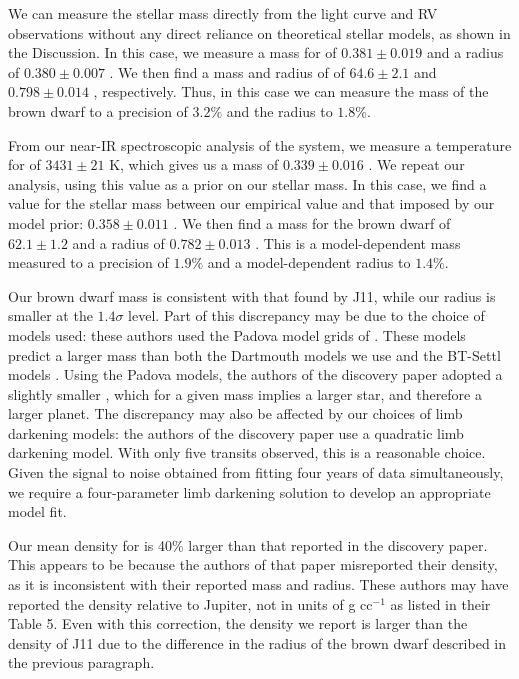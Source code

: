 We can measure the stellar mass directly from the light curve and RV observations without any direct reliance on theoretical stellar models, as shown in the Discussion.
In this case, we measure a mass for \LA{} of $0.381 \pm 0.019$ \msun{} and a radius of $0.380 \pm 0.007$ \rsun.  
We then find a mass and radius of \LC{} of $64.6 \pm 2.1$ \mjup{} and $0.798 \pm 0.014$ \rjup, respectively.
Thus, in this case we can measure the mass of the brown dwarf to a precision of $3.2\%$ and the radius to $1.8\%$. 

From our near-IR spectroscopic analysis of the system, we measure a temperature for \LA{} of $3431 \pm 21$ K, which gives us a mass of $0.339 \pm 0.016$ \msun. 
We repeat our analysis, using this value as a prior on our stellar mass.
In this case, we find a value for the stellar mass between our empirical value and that imposed by our model prior: $0.358 \pm 0.011$ \msun.
We then find a mass for the brown dwarf of $62.1 \pm 1.2$ \mjup{} and a radius of $0.782 \pm 0.013$ \rjup. 
This is a model-dependent mass measured to a precision of $1.9\%$ and a model-dependent radius to $1.4\%$. 

Our brown dwarf mass is consistent with that found by J11, while our radius is smaller at the $1.4\sigma$ level. 
Part of this discrepancy may be due to the choice of models used: these authors used the Padova model grids of \citet{Girardi02}. 
These models predict a larger mass than both the Dartmouth models we use and the BT-Settl models \citep{Allard10}.
Using the Padova models, the authors of the discovery paper adopted a slightly smaller \logg, which for a given mass implies a larger star, and therefore a larger planet.
The discrepancy may also be affected by our choices of limb darkening models: the authors of the discovery paper use a quadratic limb darkening model.
With only five transits observed, this is a reasonable choice. 
Given the signal to noise obtained from fitting four years of \itk{} data simultaneously, we require a four-parameter limb darkening solution to develop an appropriate model fit.

Our mean density for \LC{} is 40\% larger than that reported in the discovery paper.
This appears to be because the authors of that paper misreported their density, as it is inconsistent with their reported mass and radius. 
These authors may have reported the density relative to Jupiter, not in units of g cc$^{-1}$ as listed in their Table 5.
Even with this correction, the density we report is larger than the density of J11 due to the difference in the radius of the brown dwarf described in the previous paragraph.

